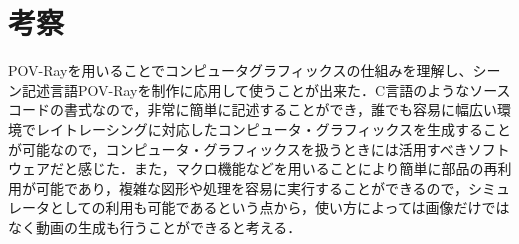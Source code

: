 \documentclass[a4j,dvipdfmx,uplatex,11pt]{jsarticle}
\begin{document}
\clearpage

\section{考察}
POV-Rayを用いることでコンピュータグラフィックスの仕組みを理解し、シーン記述言語POV-Rayを制作に応用して使うことが出来た．C言語のようなソースコードの書式なので，非常に簡単に記述することができ，誰でも容易に幅広い環境でレイトレーシングに対応したコンピュータ・グラフィックスを生成することが可能なので，コンピュータ・グラフィックスを扱うときには活用すべきソフトウェアだと感じた．また，マクロ機能などを用いることにより簡単に部品の再利用が可能であり，複雑な図形や処理を容易に実行することができるので，シミュレータとしての利用も可能であるという点から，使い方によっては画像だけではなく動画の生成も行うことができると考える．
\end{document}
